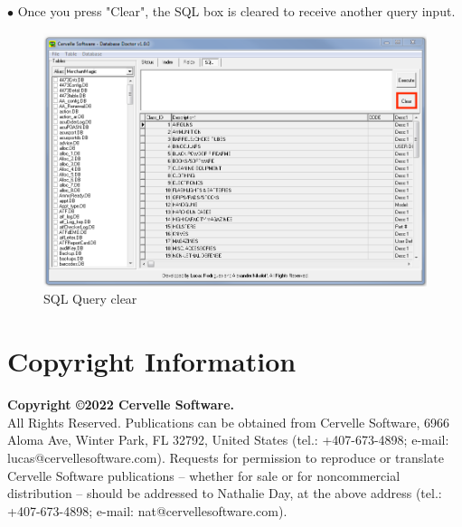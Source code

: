 \documentclass[a4paper, 11pt]{article}
\begin{document}
\vspace*{\fill}
$\bullet$ Once you press "Clear", the SQL box is cleared to receive another query input.
\begin{figure}[h]
    \centering
     \includegraphics[width=\textwidth]{capture 45}
    \caption{SQL Query clear}
\end{figure}
\vspace*{\fill}


\pagebreak

\section*{Copyright Information}
\textbf{Copyright \copyright 2022 Cervelle Software. } \\
All Rights Reserved. Publications can be obtained from Cervelle Software, 6966 Aloma Ave, Winter Park, FL 32792, United States (tel.: +407-673-4898; e-mail: lucas@cervellesoftware.com). Requests for permission to reproduce or translate Cervelle Software publications – whether for sale or for noncommercial  distribution – should be addressed to Nathalie Day, at the above address (tel.:  +407-673-4898; e-mail: nat@cervellesoftware.com). \\
\end{document}

